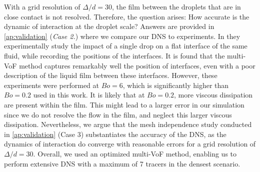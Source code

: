 
With a grid resolution of $\Delta/d = 30$, the film between the droplets that are in close contact is not resolved. 
Therefore, the question arises: How accurate is the dynamic of interaction at the droplet scale?
Answers are  provided in \ref{ap:validation} (\textit{Case 2.}) where we compare our DNS to \citet{mohamed2003drop} experiments.
In \citet{mohamed2003drop} they experimentally study the impact of a single drop on a flat interface of the same fluid, while recording the positions of the interfaces.
It is found that the multi-VoF method captures remarkably well the position of interfaces, even with a poor description of the liquid film between these interfaces.
However, these experiments were performed at $Bo = 6$, which is significantly higher than $Bo=0.2$ used in this work. 
It is likely that at $Bo = 0.2$, more viscous dissipation are present within the film.
This might lead to a larger error in our simulation since we do not resolve the flow in the film, and neglect this larger viscous dissipation.
Nevertheless, we argue that the mesh independence study conducted in \ref{ap:validation} (Case 3) substantiates the accuracy of the DNS, as the dynamics of interaction do converge with  reasonable errors for a grid resolution of $\Delta/d = 30$.
Overall, we used an optimized multi-VoF method, enabling us to perform extensive DNS with a maximum of 7 tracers in the densest scenario.
 






